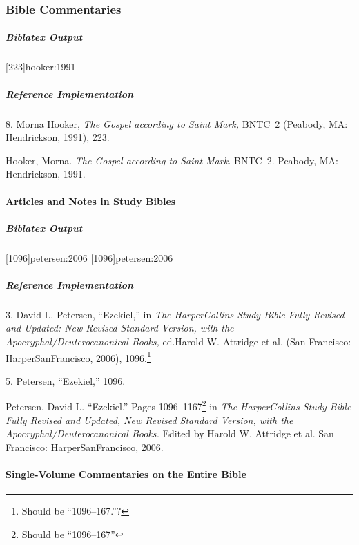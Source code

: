 \documentclass[a4paper]{article}
\renewcommand{\slash}{/\penalty\exhyphenpenalty\hspace{0pt}}
\newenvironment{biboutput}{%
  \subparagraph{Biblatex Output}
}{\color{black}}
\newenvironment{refimp}{%
  \subparagraph{Reference Implementation}
  \color{reference-colour}
  \rm
}{\par\color{black}}
\begin{document}
\subsubsection{Bible Commentaries}

\begin{biboutput}
  [223]{hooker:1991}
\end{biboutput}

\begin{refimp}
  \hspace*{\bibindent}8. Morna Hooker, \emph{The Gospel according to Saint
  Mark,} BNTC~2 (Peabody, MA: Hendrickson, 1991), 223.

  \hangindent\bibindent Hooker, Morna. \emph{The Gospel according to Saint
  Mark.} BNTC~2. Peabody, MA: Hendrickson, 1991.

\end{refimp}

\paragraph{Articles and Notes in Study Bibles}

\begin{biboutput}
  [1096]{petersen:2006}
  [1096]{petersen:2006}
\end{biboutput}

\begin{refimp}
  \hspace*{\bibindent}3. David L. Petersen, “Ezekiel,” in \emph{The
  HarperCollins Study Bible Fully Revised and Updated: New Revised Standard
  Version, with the Apocryphal\slash Deuterocanonical Books,} ed.\@ Harold W.
  Attridge et al. (San Francisco: HarperSanFrancisco, 2006),
  1096.\footnote{Should be “1096–167.”?}

  \hspace*{\bibindent}5. Petersen, “Ezekiel,” 1096.

  \hangindent\bibindent Petersen, David L. “Ezekiel.” Pages
  1096–1167\footnote{Should be “1096–167”} in \emph{The HarperCollins Study
  Bible Fully Revised and Updated, New Revised Standard Version, with the
  Apocryphal\slash Deuterocanonical Books.} Edited by Harold W. Attridge et
  al. San Francisco: HarperSanFrancisco, 2006.
\end{refimp}

\paragraph{Single-Volume Commentaries on the Entire Bible}
\end{document}
